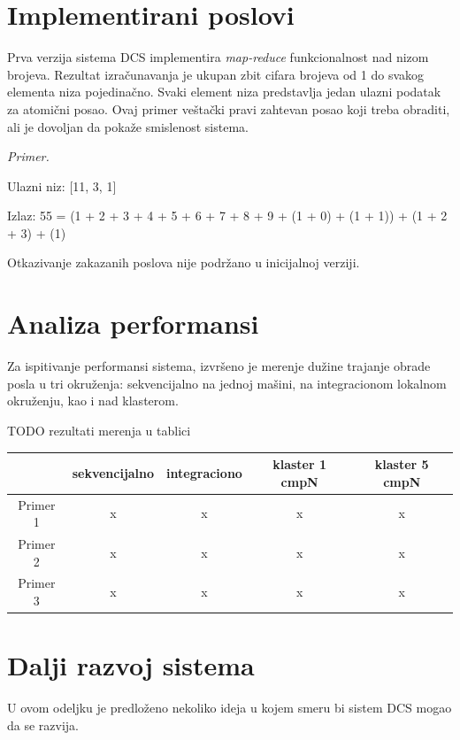 \documentclass[12pt,oneside]{memoir}
\begin{document}
\section{Implementirani poslovi}

Prva verzija sistema DCS implementira \emph{map-reduce} funkcionalnost nad nizom brojeva. Rezultat izračunavanja je ukupan zbit cifara brojeva od 1 do svakog elementa niza pojedinačno. Svaki element niza predstavlja jedan ulazni podatak za atomični posao. Ovaj primer veštački pravi zahtevan posao koji treba obraditi, ali je dovoljan da pokaže smislenost sistema.

\emph{Primer.}

Ulazni niz: [11, 3, 1]

Izlaz: 55 = (1 + 2 + 3 + 4 + 5 + 6 + 7 + 8 + 9 + (1 + 0) + (1 + 1)) + (1 + 2 + 3) + (1)

Otkazivanje zakazanih poslova nije podržano u inicijalnoj verziji.


\section{Analiza performansi}

Za ispitivanje performansi sistema, izvršeno je merenje dužine trajanje obrade posla u tri okruženja: sekvencijalno na jednoj mašini, na integracionom lokalnom okruženju, kao i nad klasterom.

TODO rezultati merenja u tablici

\begin{center}
\begin{tabular}{ |c||c|c|c|c| } 
 \hline
  & sekvencijalno & integraciono & klaster 1 cmpN & klaster 5 cmpN \\ 
 \hline
 Primer 1 & x & x & x & x \\ 
 Primer 2 & x & x & x & x \\ 
 Primer 3 & x & x & x & x \\ 
 \hline
\end{tabular}
\end{center}

\section{Dalji razvoj sistema}

U ovom odeljku je predloženo nekoliko ideja u kojem smeru bi sistem DCS mogao da se razvija.
\end{document}
